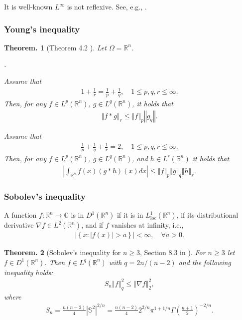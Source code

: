 \documentclass[openany, a4paper, oneside]{book}
\newcounter{enum2}
\renewenvironment{enumerate}{%
\begin{list}%
{%
\arabic{enum2}.\ \,%
}%
{%
\usecounter{enum2}
\setlength{\itemindent}{0pt}%
\setlength{\leftmargin}{6pt}%
\setlength{\rightmargin}{0pt}%
\setlength{\labelsep}{0pt}%
\setlength{\labelwidth}{6pt}%
\setlength{\itemsep}{0pt}%
\setlength{\parsep}{0pt}%
\setlength{\listparindent}{0pt}%
}
}{%
\end{list}%
}
\theoremstyle{break}
\newtheorem{thm}{Theorem.}[section]
\theoremstyle{breakdefn}
\newcommand{\abs}[1]{\left|#1\right|}
\newcommand{\norm}[1]{\left\Vert#1\right\Vert}
\newcommand{\twonorm}[1]{\norm{#1}_2}
\newcommand{\rbk}[1]{\left (#1\right)}
\newcommand{\set}[2]{\left\{#1 : #2\right\}}
\newcommand{\bbC}{\mathbb{C}}
\newcommand{\bbR}{\mathbb{R}}
\newcommand{\bbRn}{\mathbb{R}^n}
\newcommand{\bbS}{\mathbb{S}}
\newcommand{\Loneloc}{L_{\mathrm{loc}}^1}
\newcommand{\LtwoRn}{L^2 \rbk{\bbR^n}}
\begin{document}
It is well-known $L^{\infty}$ is not reflexive.
See, e.g., \cite{HaimBrezis1, HaimBrezis2}.
\subsubsection{Young's inequality}
\label{sec-7-10-2-4-2}

\begin{thm}[Theorem 4.2 \cite{LiebLoss1}]\label{Lieb-Loss_Analysis_chap11_37}
 Let $\Omega = \bbRn$.
\begin{enumerate}
\item Assume that
    \begin{align}
     1 + \frac{1}{r} = \frac{1}{p} + \frac{1}{q}, \quad 1 \leq p, q, r \leq \infty.
    \end{align}
    Then, for any $f \in L^p (\bbRn)$, $g \in L^q (\bbRn)$, it holds that
    \begin{align}
     \norm{f * g}_r
     \leq
     \norm{f}_p \norm{g_q}.
    \end{align}
\item Assume that
    \begin{align}
      \frac{1}{p} + \frac{1}{q} + \frac{1}{r} = 2, \quad 1 \leq p, q, r \leq \infty.
    \end{align}
    Then, for any $f \in L^p (\bbRn)$, $g \in L^q (\bbRn)$, and $h \in L^r \rbk{\bbRn}$ it holds that
    \begin{align}
     \abs{\int_{\bbRn} f (x) \rbk{g * h} (x) dx}
     \leq
     \norm{f}_p \norm{g}_q \norm{h}_r.
    \end{align}
\end{enumerate}
\end{thm}
\subsubsection{Sobolev's inequality}
\label{sec-7-10-2-4-3}

A function $f \colon \bbRn \to \bbC$ is in $D^1 (\bbRn)$ if it is in $\Loneloc (\bbRn)$, if its distributional derivative $\nabla f \in \LtwoRn$,
and if $f$ vanishes at infinity, i.e.,
\begin{align}
 \abs{\set{x}{\abs{f (x)} > a}} < \infty, \quad \forall a > 0.
\end{align}
\begin{thm}[Sobolev's inequality for $n \geq 3$, Section 8.3 in \cite{LiebLoss1}]\label{Lieb-Loss_Analysis_chap11_4}
 For $n \geq 3$ let $f \in D^1 (\bbRn)$.
 Then $f \in L^q (\bbRn)$ with $q = 2n/ (n-2)$ and the following inequality holds:
\begin{align}
 S_n \norm{f}_{q}^2
 \leq
 \twonorm{\nabla f}^2,
\end{align}
where
\begin{align}
 S_n
 =
 \frac{n (n-2)}{4} \abs{\bbS^2}^{2/n}
 =
 \frac{n (n-2)}{4} 2^{2/n} \pi^{1 + 1/n} \Gamma \rbk{\frac{n+1}{2}}^{-2/n}.
\end{align}
\end{thm}
\end{document}
